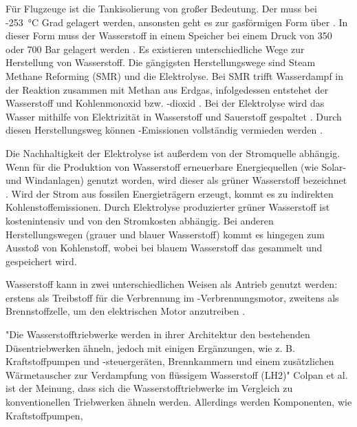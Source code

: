 Für Flugzeuge ist die Tankisolierung von großer Bedeutung. Der  muss bei -253 °C Grad gelagert werden, 
ansonsten geht es zur gasförmigen Form über \cite{colpan2022fuel}. In dieser Form muss der Wasserstoff in einem Speicher
bei einem Druck von 350 oder 700 Bar gelagert werden \cite{colpan2022fuel}.
%
Es existieren unterschiedliche Wege zur Herstellung von Wasserstoff. 
Die gängigsten Herstellungswege sind Steam Methane Reforming (SMR) und die Elektrolyse. %
Bei SMR trifft Wasserdampf in der Reaktion zusammen mit Methan aus Erdgas, infolgedessen entstehet der
Wasserstoff  und Kohlenmonoxid bzw. -dioxid \cite{mulder2019outlook}. Bei der Elektrolyse wird das Wasser mithilfe von Elektrizität 
in Wasserstoff und Sauerstoff  gespaltet \cite{mulder2019outlook}. Durch diesen Herstellungsweg können -Emissionen 
vollständig vermieden werden \cite{dalmia2022powering}. 

Die Nachhaltigkeit der Elektrolyse ist außerdem von der Stromquelle abhängig. 
Wenn für die Produktion von Wasserstoff erneuerbare Energiequellen (wie Solar- und Windanlagen) genutzt worden, 
wird dieser als grüner Wasserstoff bezeichnet \cite{mulder2019outlook}. 
Wird der Strom aus fossilen Energieträgern erzeugt, kommt es zu indirekten Kohlenstoffemissionen.
Durch Elektrolyse produzierter grüner Wasserstoff ist kostenintensiv \cite{dalmia2022powering} und von den Stromkosten abhängig. 
Bei anderen Herstellungswegen (grauer und blauer Wasserstoff)
kommt es hingegen zum Ausstoß von Kohlenstoff, wobei bei blauem Wasserstoff das  gesammelt und gespeichert \cite{mulder2019outlook} wird.
%

Wasserstoff kann in zwei unterschiedlichen Weisen als Antrieb genutzt werden: 
erstens als Treibstoff für die Verbrennung im -Verbrennungsmotor,
zweitens als Brennstoffzelle, um den elektrischen Motor anzutreiben \cite{sky2020hydrogen}.

"Die Wasserstofftriebwerke werden in ihrer Architektur den bestehenden Düsentriebwerken ähneln, 
jedoch mit einigen Ergänzungen, wie z. B. Kraftstoffpumpen und -steuergeräten, Brennkammern und
 einem zusätzlichen Wärmetauscher zur Verdampfung von flüssigem Wasserstoff (LH2)" \cite{colpan2022fuel}
Colpan et al. \cite{colpan2022fuel} ist der Meinung, dass sich die Wasserstofftriebwerke im Vergleich zu konventionellen Triebwerken ähneln werden. 
Allerdings werden Komponenten, wie Kraftstoffpumpen, 

